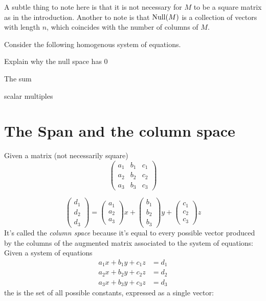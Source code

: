 \documentclass{ximera}
\begin{document}
\begin{remark}
  A subtle thing to note here is that it is not necessary for $M$ to be
  a square matrix as in the introduction. Another to note is that
  $\operatorname{Null}(M)$ is a collection of vectors with length $n$, which coincides
  with the number of columns of $M$.
\end{remark}


\begin{example}
  Consider the following homogenous system of equations.

  Explain why the null space has 0

  The sum

  scalar multiples

\end{example}





\section{The Span and the column space}

Given a matrix (not necessarily square)
\[
\begin{pmatrix}
  a_1 &  b_1  &  c_1 \\
  a_2 & b_2 & c_2 \\
  a_3 & b_3 & c_3
\end{pmatrix}
\]

\[
\begin{pmatrix} d_1 \\ d_2 \\ d_3 \end{pmatrix}=\begin{pmatrix} a_1 \\ a_2 \\ a_3 \end{pmatrix} x +
\begin{pmatrix} b_1 \\ b_2 \\ b_3 \end{pmatrix} y +
\begin{pmatrix} c_1 \\ c_2 \\ c_3 \end{pmatrix} z
\]
It's called the \textit{column space} because it's equal to every
possible vector produced by the columns of the augmented matrix
associated to the system of equations:
Given a system of equations
\begin{align*}
  a_1 x + b_1 y + c_1 z &= d_1\\
  a_2 x + b_2 y + c_2 z &= d_2\\
  a_3 x + b_3 y + c_3 z &= d_3
\end{align*}
the  is the set of all possible constants, expressed
as a single vector:
\end{document}
